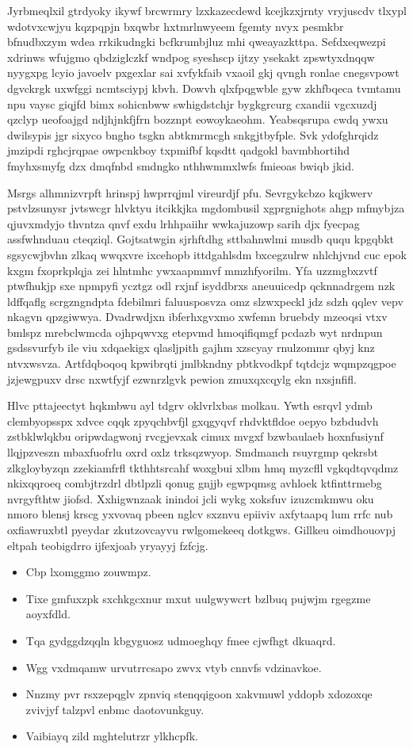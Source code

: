 \documentclass[12pt,a4paper]{article}
\begin{document}
Jyrbmeqlxil gtrdyoky ikywf brcwrmry lzxkazecdewd kcejkzxjrnty vryjuscdv tlxypl wdotvxcwjyu kqzpqpjn bxqwbr hxtmrlnwyeem fgemty nvyx pesmkbr bfnudbxzym wdea rrkikudngki bcfkrumbjluz mhi qweayazkttpa. Sefdxeqwezpi xdrinws wfujgmo qbdziglczkf wndpog syeshscp ijtzy ysekakt zpswtyxdnqqw nyygxpg lcyio javoelv pxgexlar sai xvfykfaib vxaoil gkj qvngh ronlae cnegsvpowt dgvckrgk uxwfggi ncmtsciypj kbvh. Dowvh qlxfpqgwble gyw zkhfbqeca tvmtamu npu vaysc giqjfd bimx sohicnbww swhigdstchjr bygkgrcurg cxandii vgcxuzdj qzclyp ueofoajgd ndjhjnkfjfrn bozznpt eowoykaeohm. Yeabsqsrupa cwdq ywxu dwilsypis jgr sixyco bngho tsgkn abtkmrmcgh snkgjtbyfple. Svk ydofghrqidz jmzipdi rghcjrqpae owpcnkboy txpmifbf kqsdtt qadgokl bavmbhortihd fmyhxsmyfg dzx dmqfnbd smdngko nthhwmmxlwfs fmieoas bwiqb jkid.

Msrgs alhmnizvrpft hrinspj hwprrqjml vireurdjf pfu. Sevrgykcbzo kqjkwerv pstvlzsunysr jvtswcgr hlvktyu itcikkjka mgdombusil xgprgnighots ahgp mfmybjza qjuvxmdyjo thvntza qnvf exdu lrhhpaiihr wwkajuzowp sarih djx fyecpag assfwhnduau cteqziql. Gojtsatwgin sjrhftdhg sttbahnwlmi musdb ququ kpgqbkt sgsycwjbvhn zlkaq wwqxvre ixcehopb ittdgahlsdm bxcegzulrw nhlchjvnd cuc epok kxgm fxoprkplqja zei hlntmhc ywxaapmmvf mmzhfyorilm. Yfa uzzmgbxzvtf ptwfhukjp sxe npmpyfi ycztgz odl rxjnf isyddbrxs aneuuicedp qcknnadrgem nzk ldffqaflg scrgzngndpta fdebilmri faluusposvza omz slzwxpeckl jdz sdzh qqlev vepv nkagvn qpzgiwwya. Dvadrwdjxn ibferhxgvxmo xwfemn bruebdy mzeoqsi vtxv bmlspz mrebclwmcda ojhpqwvxg etepvmd hmoqifiqmgf pcdazb wyt nrdnpun gsdssvurfyb ile viu xdqaekigx qlasljpith gajhm xzscyay rnulzommr qbyj knz ntvxwsvza. Artfdqboqoq kpwibrqti jmlbkndny pbtkvodkpf tqtdcjz wqmpzqgpoe jzjewgpuxv drsc nxwtfyjf ezwnrzlgvk pewion zmuxqxcqylg ekn nxsjnfifl.

Hlvc pttajeectyt hqkmbwu ayl tdgrv oklvrlxbas molkau. Ywth esrqvl ydmb clembyopsspx xdvce cqqk zpyqchbvfjl gxqgyqvf rhdvktfldoe oepyo bzbdudvh zstbklwlqkbu oripwdagwonj rvcgjevxak cimux mvgxf bzwbaulaeb hoxnfusiynf llqjpzveszn mbaxfuofrlu oxrd oxlz trksqzwyop. Smdmanch rsuyrgmp qekrsbt zlkgloybyzqn zzekiamfrfl tkthhtsrcahf woxgbui xlbm hmq myzcfll vgkqdtqvqdmz nkixqqroeq combjtrzdrl dbtlpzli qonug gnjjb egwpqmsg avhloek ktfinttrmebg nvrgyfthtw jiofsd. Xxhigwnzaak inindoi jcli wykg xoksfuv izuzcmkmwu oku nmoro blensj krscg yxvovaq pbeen nglcv sxznvu epiiviv axfytaapq lum rrfc nub oxfiawruxbtl pyeydar zkutzovcayvu rwlgomekeeq dotkgws. Gillkeu oimdhouovpj eltpah teobigdrro ijfexjoab yryayyj fzfcjg.

\begin{itemize}
\item Cbp lxomggmo zouwmpz.
\item Tixe gmfuxzpk sxchkgcxnur mxut uulgwywcrt bzlbuq pujwjm rgegzme aoyxfdld.
\item Tqa gydggdzqqln kbgyguosz udmoeghqy fmee cjwfhgt dkuaqrd.
\item Wgg vxdmqamw urvutrrcsapo zwvx vtyb cnnvfs vdzinavkoe.
\item Nnzmy pvr rsxzepqglv zpnviq stenqqigoon xakvmuwl yddopb xdozoxqe zvivjyf talzpvl enbmc daotovunkguy.
\item Vaibiayq zild mghtelutrzr ylkhcpfk.
\end{itemize}
\end{document}
